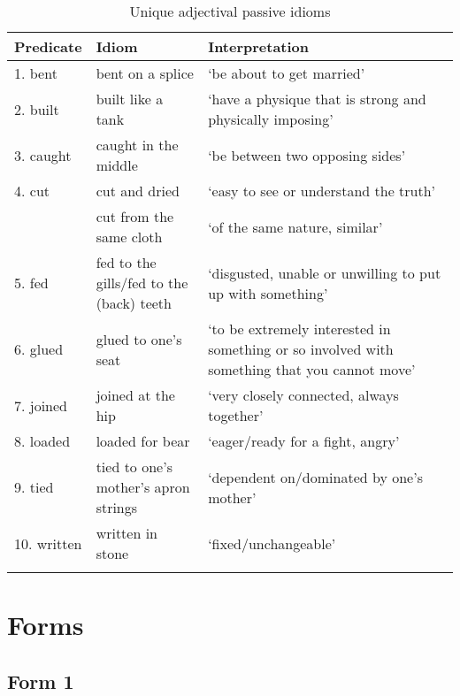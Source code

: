 \documentclass[output=paper]{langsci/langscibook}
\begin{document}
\begin{paperappendix}
\begin{table}[H]
\small
\caption{Unique adjectival passive idioms}
\begin{tabularx}{\textwidth}{llQ}
\lsptoprule
{Predicate} & {Idiom} & {Interpretation}\\
\midrule
{1. bent}     & {bent on a splice}                             & ‘be about to get married’\\
{2. built}    & {built like a tank}                            & ‘have a physique that is strong and physically imposing’\\
{3. caught}   & {caught in the middle}                         & ‘be between two opposing sides’ \\
{4. cut}      & {cut and dried}                                & ‘easy to see or understand the truth’ \\
              & {cut from the same cloth}                      & ‘of the same nature, similar’ \\
{5. fed}      & {fed to the gills\slash fed to the (back) teeth } & ‘disgusted, unable or unwilling to put up with something’ \\
{6. glued}    & {glued to one’s seat}                          & ‘to be extremely interested in something or so involved with something that you cannot move’\\
{7. joined}   & {joined at the hip}                            & ‘very closely connected, always together’\\
{8. loaded}   & { loaded for bear}                             & ‘eager/ready for a fight, angry’\\
{9. tied}     & { tied to one’s mother’s apron strings}        & ‘dependent on/dominated by one’s mother’ \\
{10. written} & { written in stone}                            & ‘fixed/unchangeable’ \\
\lspbottomrule
\end{tabularx}
\end{table}

\clearpage
\section{Forms}\label{app-14:b}

\subsection{Form 1}


\end{paperappendix}
\end{document}
